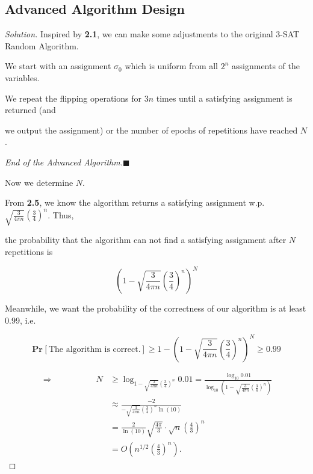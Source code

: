 \documentclass{article}
\renewcommand{\qedsymbol}{\hfill $\blacksquare$\par}
\renewcommand{\Pr}[2]{\mathbf{Pr}_{#1}\left[#2\right]}
\newenvironment{solution}{\begin{proof}[\noindent\it Solution]}{\end{proof}}
\begin{document}
\subsection{Advanced Algorithm Design}
\begin{solution}
    Inspired by \textbf{2.1}, we can make some adjustments to the original 3-SAT Random Algorithm.
    
    \hspace{2.6em}
    We start with an assignment $\sigma_0$ which is uniform from all $2^n$ assignments of the variables. 
    
    \hspace{2.6em}
    We repeat the flipping operations for $3n$ times until a 
    satisfying assignment is returned (and 
    
    we output the assignment) or the number of epochs of repetitions have reached $N$.
    
    \hspace{27.5em}\textit{End of the Advanced Algorithm.}\qedsymbol
    
    \vspace{2em}\hspace{2.6em}
    Now we determine $N$.
    
    \hspace{2.6em}
    From \textbf{2.5}, we know the algorithm returns a satisfying assignment w.p. $\sqrt{\frac{3}{4\pi n}}\left(\frac{3}{4}\right)^n$. Thus, 
    
    the probability that the algorithm can not find a satisfying assignment after $N$ repetitions is
    
    \vspace{-0.6em}
    $$\left(1-\sqrt{\frac{3}{4\pi n}}\left(\frac{3}{4}\right)^n\right)^N$$
    
    \hspace{2.6em}
    Meanwhile, we want the probability of the correctness of our algorithm is at least 0.99, i.e.
    
    $$\Pr{}{\text{The algorithm is correct.}}\geq 1-\left(1-\sqrt{\frac{3}{4\pi n}}\left(\frac{3}{4}\right)^n\right)^N\geq 0.99 $$
    
    \vspace{-2.5em}
    \begin{align*}
        \Longrightarrow\qquad\qquad\quad N & \geq\log_{1-\sqrt{\frac{3}{4\pi n}}\left(\frac{3}{4}\right)^n} 0.01 = \frac{\log_{10}{0.01}}{\log_{10}{\left(1-\sqrt{\frac{3}{4\pi n}}\left(\frac{3}{4}\right)^n\right)}} \\
        & \approx \frac{-2}{-\sqrt{\frac{3}{4\pi n}}\left(\frac{3}{4}\right)^n\ln(10)}\\
        & = \frac{2}{\ln(10)}\sqrt{\frac{4\pi}{3}}\cdot\sqrt{n}\left(\frac{4}{3}\right)^n \\
        & = O\left(n^{1/2}\left(\frac{4}{3}\right)^n\right).
    \end{align*}
    

\end{solution}
\end{document}
